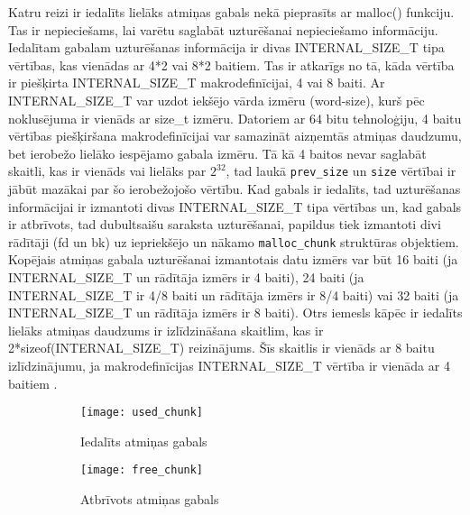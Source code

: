 Katru reizi ir iedalīts lielāks atmiņas gabals nekā pieprasīts ar malloc() funkciju.
Tas ir nepieciešams, lai varētu saglabāt uzturēšanai nepieciešamo informāciju. 
Iedalītam gabalam uzturēšanas informācija ir divas INTERNAL\_SIZE\_T tipa vērtības, kas vienādas ar 4*2 vai 8*2 baitiem. 
Tas ir atkarīgs no tā, kāda vērtība ir piešķirta INTERNAL\_SIZE\_T makrodefinīcijai, 4 vai 8 baiti.
Ar INTERNAL\_SIZE\_T var uzdot iekšējo vārda izmēru (word-size), kurš pēc noklusējuma ir vienāds ar size\_t izmēru.
Datoriem ar 64 bitu tehnoloģiju, 4 baitu vērtības piešķiršana makrodefinīcijai  var samazināt aizņemtās atmiņas daudzumu, bet ierobežo lielāko iespējamo gabala izmēru.
Tā kā 4 baitos nevar saglabāt skaitli, kas ir vienāds vai lielāks par \(2^{32}\), tad laukā \texttt{prev\_size} un \texttt{size} vērtībai ir jābūt mazākai par šo ierobežojošo vērtību.
Kad gabals ir iedalīts, tad uzturēšanas informācijai ir izmantoti divas INTERNAL\_SIZE\_T tipa vērtības un, kad gabals ir atbrīvots, tad  dubultsaišu saraksta uzturēšanai, papildus tiek izmantoti divi rādītāji (fd un bk) uz iepriekšējo un nākamo \texttt{malloc\_chunk} struktūras objektiem. 
Kopējais atmiņas gabala uzturēšanai izmantotais datu izmērs var būt 16 baiti (ja INTERNAL\_SIZE\_T un rādītāja izmērs ir 4 baiti), 24 baiti (ja INTERNAL\_SIZE\_T ir 4/8 baiti un rādītāja izmērs ir 8/4 baiti) vai 32 baiti (ja INTERNAL\_SIZE\_T un rādītāja izmērs ir 8 baiti).  
Otrs iemesls kāpēc ir iedalīts lielāks atmiņas daudzums ir izlīdzināšana skaitlim, kas ir  2*sizeof(INTERNAL\_SIZE\_T) reizinājums. Šīs skaitlis ir vienāds ar 8 baitu izlīdzinājumu, ja  makrodefinīcijas INTERNAL\_SIZE\_T vērtība  ir vienāda ar 4 baitiem \cite {MALLOC}.  

 \begin{figure}[h]
\begin{center}
\begin{subfigure}[t]{0.5\textwidth}
        \centering
        \texttt{[image: used\_chunk]}
        \caption{Iedalīts atmiņas gabals}
    \end{subfigure}%
\begin{subfigure}[t]{0.5\textwidth}
        \centering
        \texttt{[image: free\_chunk]}
        \caption{Atbrīvots atmiņas gabals}
    \end{subfigure}%
\end{center}
\caption{\textbf{\fontsize{11}{12}\selectfont {Atmiņas gabalu struktūra}}}
\label{fig:chunks}
\end{figure}


